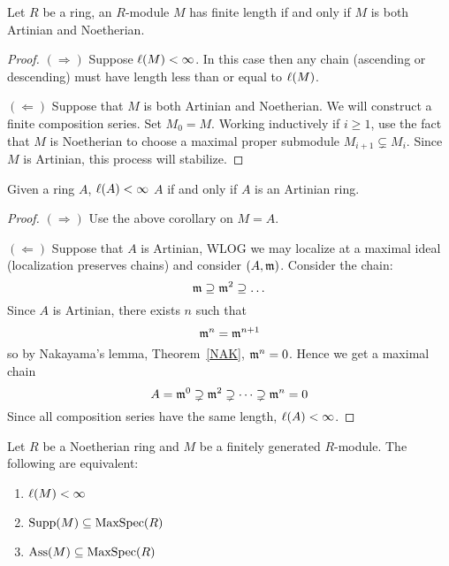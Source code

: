 \documentclass{ximera}
\begin{document}
\begin{corollary}
  Let $R$ be a ring, an $R$-module $M$ has finite length if and only
  if $M$ is both Artinian and Noetherian.
  \begin{proof}
    $(\Rightarrow)$ Suppose $\ell(M)<\infty$. In this case then any
    chain (ascending or descending) must have length less than or
    equal to $\ell(M)$.

    $(\Leftarrow)$ Suppose that $M$ is both Artinian and Noetherian.
    We will construct a finite composition series. Set $M_0 =
    M$. Working inductively if $i\ge 1$, use the fact that $M$ is
    Noetherian to choose a maximal proper submodule $M_{i+1}\subsetneq
    M_i$. Since $M$ is Artinian, this process will stabilize.
  \end{proof}
\end{corollary}



\begin{corollary}
  Given a ring $A$, $\ell(A)<\infty$ $A$ if and only if $A$ is an
  Artinian ring.
  \begin{proof}
    $(\Rightarrow)$ Use the above corollary on $M = A$.

    $(\Leftarrow)$ Suppose that $A$ is Artinian, WLOG we may localize
    at a maximal ideal (localization preserves chains) and consider
    $(A,\mathfrak{m})$. Consider the chain:
    \[
    \mathfrak{m}\supseteq \mathfrak{m}^2\supseteq \dots
    \]
    Since $A$ is Artinian, there exists $n$ such that
    \[
    \mathfrak{m}^n = \mathfrak{m}^{n+1}
    \]
    so by Nakayama's lemma, Theorem~\ref{NAK},
      $\mathfrak{m}^n = 0$.  Hence we get a maximal chain
      \[
      A = \mathfrak{m}^0 \supsetneq \mathfrak{m}^2 \supsetneq\dots \supsetneq \mathfrak{m}^n = 0
      \]
      Since all composition series have the same length,
      $\ell(A)<\infty$.
  \end{proof}
\end{corollary}



\begin{exercise}
  Let $R$ be a Noetherian ring and $M$ be a finitely generated
  $R$-module. The following are equivalent:
  \begin{enumerate}
  \item $\ell(M)<\infty$
  \item $\operatorname{Supp}(M)\subseteq\operatorname{MaxSpec}(R)$
  \item $\operatorname{Ass}(M)\subseteq\operatorname{MaxSpec}(R)$
  \end{enumerate}
\end{exercise}
\end{document}
